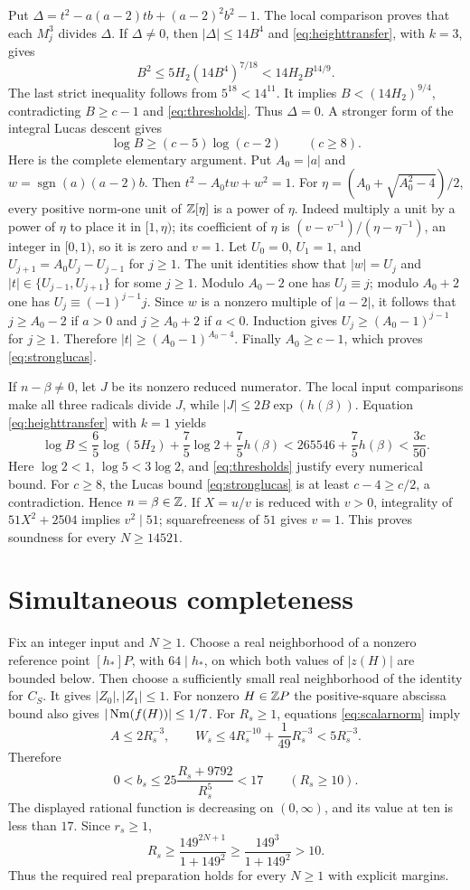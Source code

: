 \documentclass[11pt,a4paper]{article}
\begin{document}
Put $\Delta=t^2-a(a-2)tb+(a-2)^2b^2-1$.
The local comparison proves that each $M_j^3$ divides $\Delta$.
If $\Delta\ne0$, then $|\Delta|\le14B^4$ and
\eqref{eq:heighttransfer}, with $k=3$, gives
\[
 B^2\le5H_2(14B^4)^{7/18}<14H_2B^{14/9}.
\]
The last strict inequality follows from $5^{18}<14^{11}$.
It implies $B<(14H_2)^{9/4}$, contradicting $B\ge c-1$ and
\eqref{eq:thresholds}. Thus $\Delta=0$.
A stronger form of the integral Lucas descent gives
\begin{equation}\label{eq:stronglucas}
              \log B\ge(c-5)\log(c-2)\qquad(c\ge8).
\end{equation}
Here is the complete elementary argument. Put $A_0=|a|$ and
$w=\operatorname{sgn}(a)(a-2)b$. Then
$t^2-A_0tw+w^2=1$. For
$\eta=(A_0+\sqrt{A_0^2-4})/2$, every positive norm-one unit of
$\mathbb Z[\eta]$ is a power of $\eta$. Indeed multiply a unit by a
power of $\eta$ to place it in $[1,\eta)$; its coefficient of
$\eta$ is $(v-v^{-1})/(\eta-\eta^{-1})$, an integer in $[0,1)$,
so it is zero and $v=1$.
Let $U_0=0$, $U_1=1$, and $U_{j+1}=A_0U_j-U_{j-1}$ for $j\ge1$.
The unit identities show that $|w|=U_j$ and
$|t|\in\{U_{j-1},U_{j+1}\}$ for some $j\ge1$.
Modulo $A_0-2$ one has $U_j\equiv j$; modulo $A_0+2$ one has
$U_j\equiv(-1)^{j-1}j$. Since $w$ is a nonzero multiple of
$|a-2|$, it follows that $j\ge A_0-2$ if $a>0$ and
$j\ge A_0+2$ if $a<0$. Induction gives
$U_j\ge(A_0-1)^{j-1}$ for $j\ge1$. Therefore
$|t|\ge(A_0-1)^{A_0-4}$. Finally $A_0\ge c-1$, which proves
\eqref{eq:stronglucas}.

If $n-\beta\ne0$, let $J$ be its nonzero reduced numerator.
The local input comparisons make all three radicals divide $J$,
while $|J|\le2B\exp(h(\beta))$. Equation \eqref{eq:heighttransfer}
with $k=1$ yields
\[
 \log B\le\frac65\log(5H_2)+\frac75\log2+\frac75h(\beta)
       <265546+\frac75h(\beta)<\frac{3c}{50}.
\]
Here $\log2<1$, $\log5<3\log2$, and
\eqref{eq:thresholds} justify every numerical bound.
For $c\ge8$, the Lucas bound \eqref{eq:stronglucas} is at least
$c-4\ge c/2$, a contradiction. Hence $n=\beta\in\mathbb Z$.
If $X=u/v$ is reduced with $v>0$, integrality of $51X^2+2504$
implies $v^2\mid51$; squarefreeness of $51$ gives $v=1$.
This proves soundness for every $N\ge14521$.

\section{Simultaneous completeness}
Fix an integer input and $N\ge1$. Choose a real neighborhood of a
nonzero reference point $[h_*]P$, with $64\mid h_*$, on which
both values of $|z(H)|$ are bounded below. Then choose a sufficiently
small real neighborhood of the identity for $C_S$. It gives
$|Z_0|,|Z_1|\le1$. For nonzero $H\in\mathbb Z P$ the positive-square
abscissa bound also gives $|\operatorname{Nm}(f(H))|\le1/7$.
For $R_s\ge1$, equations \eqref{eq:scalarnorm} imply
\[
 A\le2R_s^{-3},\qquad
 W_s\le4R_s^{-10}+\frac1{49}R_s^{-3}<5R_s^{-3}.
\]
Therefore
\[
 0<b_s\le25\frac{R_s+9792}{R_s^5}<17\qquad(R_s\ge10).
\]
The displayed rational function is decreasing on $(0,\infty)$, and
its value at ten is less than $17$. Since $r_s\ge1$,
\[
 R_s\ge\frac{149^{2N+1}}{1+149^2}
       \ge\frac{149^3}{1+149^2}>10.
\]
Thus the required real preparation holds for every $N\ge1$ with
explicit margins.
\end{document}
